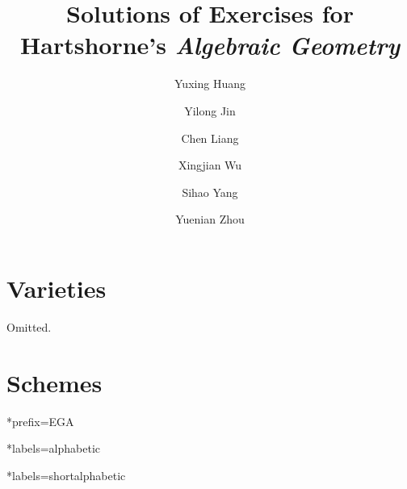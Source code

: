 \documentclass{amsart}
\title{Solutions of Exercises for Hartshorne's \emph{Algebraic Geometry}}
\date{}
\author{Yuxing Huang}
\author{Yilong Jin}
\author{Chen Liang}
\author{Xingjian Wu}
\author{Sihao Yang}
\author{Yuenian Zhou}
\theoremstyle{definition}
\theoremstyle{remark}\newtheorem{rmk}[theorem]{Remark}
\begin{document}
	\maketitle
	\tableofcontents
	\section{Varieties}
	Omitted.
	\section{Schemes}
	
	
	
	
	\begin{bibdiv}
		\begin{biblist}*{prefix={EGA}}
		\end{biblist}
		\begin{biblist}*{labels={alphabetic}}
		\end{biblist}
        \begin{biblist}*{labels={shortalphabetic}}
        \end{biblist}
	\end{bibdiv}
\end{document}
